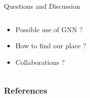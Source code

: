 \documentclass[11pt]{beamer}
\begin{document}
\begin{frame}{Questions and Discussion}
  \begin{columns}
    \begin{column}{.6\textwidth}
  {\Large
    \begin{itemize}
    \item Possible use of GNN ?
    \item How to find our place ?
    \item Collaborations ?
    \end{itemize}
  }
      
    \end{column}
    \begin{column}{.4\textwidth}
    \end{column}
  \end{columns}
\end{frame}


\nocite{*}
\begin{frame}[allowframebreaks]
  \frametitle{References}
      
      
\end{frame}
\end{document}
